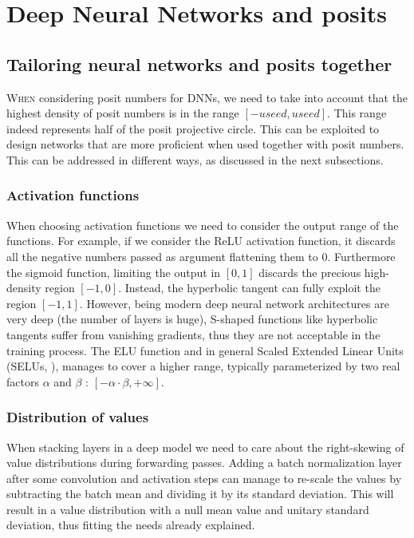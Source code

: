 
\chapter{Deep Neural Networks and posits}\label{chap:posit_networks}
\section{Tailoring neural networks and posits together}

\lettrine{W}{hen} considering posit numbers for DNNs, we need to take into account that the highest density of posit numbers is in the range $[-useed,useed]$. This range indeed represents half of the posit projective circle. This can be exploited to design networks that are more proficient when used together with posit numbers. This can be addressed in different ways, as discussed in the next subsections.

\subsection{Activation functions} When choosing activation functions we need to consider the output range of the functions. For example, if we consider the ReLU activation function, it discards all the negative numbers passed as argument flattening them to $0$. Furthermore the sigmoid function, limiting the output in $[0,1]$ discards the precious high-density region $[-1,0]$. Instead, the hyperbolic tangent can fully exploit the region $[-1,1]$. However, being modern deep neural network architectures are very deep (the number of layers is huge), S-shaped functions like hyperbolic tangents suffer from vanishing gradients, thus they are not acceptable in the training process. The ELU function and in general Scaled Extended Linear Units (SELUs, \cite{NIPS2017_6698}), manages to cover a higher range, typically parameterized by two real factors $\alpha$ and $\beta$ : $[-\alpha \cdot \beta,+\infty]$.

\subsection{Distribution of values} When stacking layers in a deep model we need to care about the right-skewing of value distributions during forwarding passes. Adding a batch normalization layer \cite{Ioffe:2015:BNA:3045118.3045167} after some convolution and activation steps can manage to re-scale the values by subtracting the batch mean and dividing it by its standard deviation. This will result in a value distribution with a null mean value and unitary standard deviation, thus fitting the needs already explained. 

